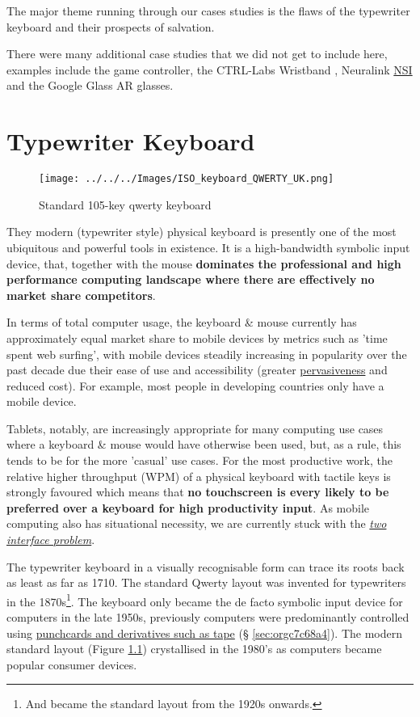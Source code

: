 \documentclass[logo,bsc,singlespacing,parskip]{infthesis}
\begin{document}
The major theme running through our cases studies is the flaws of the typewriter keyboard and their prospects of salvation.

There were many additional case studies that we did not get to include here, examples include the game controller, the CTRL-Labs Wristband \autocite{27CTRLlabsLinkedIn}, Neuralink \hyperref[orgf403bf3]{NSI} \autocite{muskNeuralink} and the Google Glass AR glasses.
\chapter{Typewriter Keyboard}
\label{sec:org20f3860}
\begin{figure}[h]
\centering
\texttt{[image: ../../../Images/ISO\_keyboard\_QWERTY\_UK.png]}
\caption{\label{fig:stand_keyb}Standard 105-key qwerty keyboard}
\end{figure}

They modern (typewriter style) physical keyboard is presently one of the most ubiquitous and powerful tools in existence.
It is a high-bandwidth symbolic input device, that, together with the mouse \textbf{dominates the professional and high performance computing landscape where there are effectively no market share competitors}.

In terms of total computer usage, the keyboard \& mouse currently has approximately equal market share to mobile devices by metrics such as 'time spent web surfing', with mobile devices steadily increasing in popularity over the past decade due their ease of use and accessibility (greater \hyperref[pervasiveness]{pervasiveness} and reduced cost).
For example, most people in developing countries only have a mobile device.

Tablets, notably, are increasingly appropriate for many computing use cases where a keyboard \& mouse would have otherwise been used, but, as a rule, this tends to be for the more 'casual' use cases.
For the most productive work, the relative higher throughput (WPM) of a physical keyboard with tactile keys is strongly favoured which means that \textbf{no touchscreen is every likely to be preferred over a keyboard for high productivity input}.
As mobile computing also has situational necessity, we are currently stuck with the \emph{\hyperref[two interface problem]{two interface problem}}.

The typewriter keyboard in a visually recognisable form can trace its roots back as least as far as 1710.
The standard Qwerty layout was invented for typewriters in the 1870s\footnote{And became the standard layout from the 1920s onwards.}.
The keyboard only became the de facto symbolic input device for computers in the late 1950s, previously computers were predominantly controlled using \hyperref[sec:orgc7c68a4]{punchcards and derivatives such as tape} (§ \ref{sec:orgc7c68a4}).
The modern standard layout (Figure \ref{fig:stand_keyb}) crystallised in the 1980's as computers became popular consumer devices.
\end{document}
